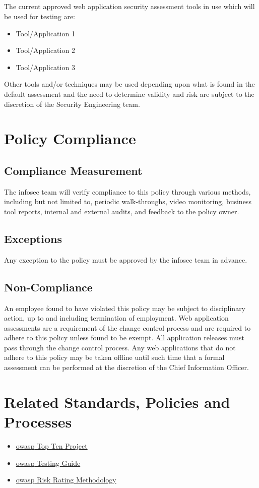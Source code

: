 \subsection*{}
The current approved web application security assessment tools in use which will be used for testing are:
\begin{itemize}
\item{Tool/Application 1}%
\item{Tool/Application 2}%
\item{Tool/Application 3}%
\end{itemize}
Other tools and/or techniques may be used depending upon what is found in the default assessment and the need to determine validity and risk are subject to the discretion of the Security Engineering team.
\section{Policy Compliance}
\subsection{Compliance Measurement}
The \gls{infosec} team will verify compliance to this policy through various methods, including but not limited to, periodic walk-throughs, video monitoring, business tool reports, internal and external audits, and feedback to the policy owner.  
\subsection{Exceptions}
Any exception to the policy must be approved by the \gls{infosec} team in advance. 
\subsection{Non-Compliance}
An employee found to have violated this policy may be subject to disciplinary action, up to and including termination of employment.  
Web application assessments are a requirement of the change control process and are required to adhere to this policy unless found to be exempt.  
All application releases must pass through the change control process.  
Any web applications that do not adhere to this policy may be taken offline until such time that a formal assessment can be performed at the discretion of the Chief Information Officer.
\section{Related Standards, Policies and Processes}
\begin{itemize}
\item{}\href{http://www.owasp.org/index.php/Category:OWASP_Top_Ten_Project}{\gls{owasp} Top Ten Project}
\item{}\href{http://www.owasp.org/images/5/56/OWASP_Testing_Guide_v3.pdf}{\gls{owasp} Testing Guide}
\item{}\href{http://www.owasp.org/index.php/OWASP_Risk_Rating_Methodology}{\gls{owasp} Risk Rating Methodology}
\end{itemize}
